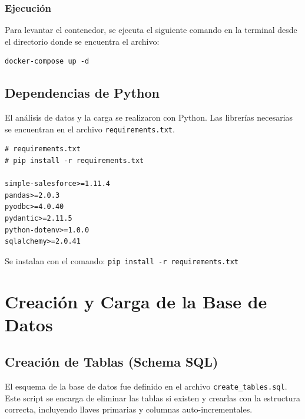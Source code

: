 \documentclass[11pt, a4paper]{article}
\begin{document}
\subsubsection{Ejecución}
Para levantar el contenedor, se ejecuta el siguiente comando en la terminal desde el directorio donde se encuentra el archivo:
\begin{verbatim}
docker-compose up -d
\end{verbatim}


\subsection{Dependencias de Python}
El análisis de datos y la carga se realizaron con Python. Las librerías necesarias se encuentran en el archivo \texttt{requirements.txt}.
\begin{lstlisting}
# requirements.txt
# pip install -r requirements.txt

simple-salesforce>=1.11.4
pandas>=2.0.3
pyodbc>=4.0.40
pydantic>=2.11.5
python-dotenv>=1.0.0
sqlalchemy>=2.0.41

\end{lstlisting}
Se instalan con el comando: \texttt{pip install -r requirements.txt}

\newpage
\section{Creación y Carga de la Base de Datos}

\subsection{Creación de Tablas (Schema SQL)}
El esquema de la base de datos fue definido en el archivo \texttt{create\_tables.sql}. Este script se encarga de eliminar las tablas si existen y crearlas con la estructura correcta, incluyendo llaves primarias y columnas auto-incrementales.
\end{document}
